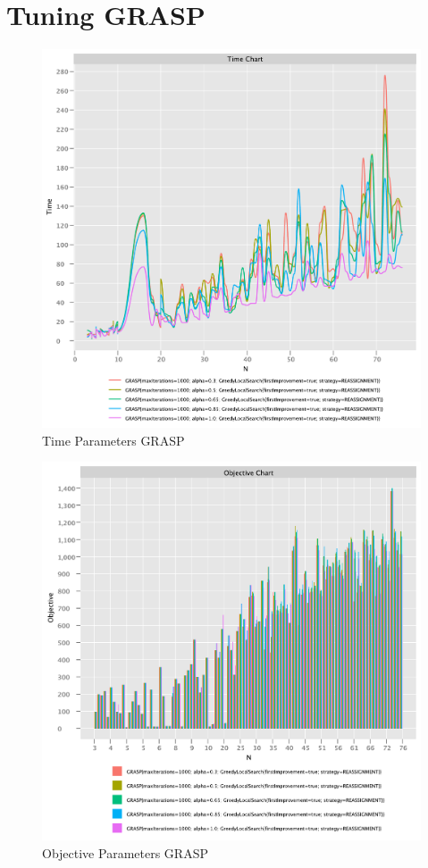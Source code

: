 \documentclass{article}
\begin{document}
\newpage

\section{Tuning GRASP}

\begin{figure}[!h]
    \centering
    \includegraphics[width=1\textwidth]{./documentation/assets/GRASPParams.timeChart.pdf}
    \caption{Time Parameters GRASP}
    \label{fig:grasp_time}
\end{figure}\FloatBarrier

\begin{figure}
    \centering
    \includegraphics[width=1\textwidth]{./documentation/assets/GRASPParams.objectiveChart.pdf}
    \caption{Objective Parameters GRASP}
    \label{fig:grasp_time}
\end{figure}\FloatBarrier
\end{document}
